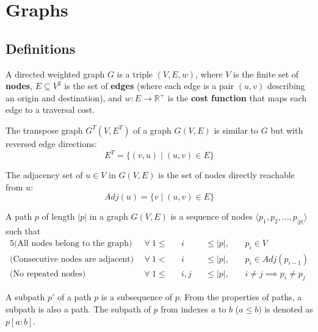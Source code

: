 \section{Graphs} \label{graphs}
\subsection{Definitions}
\begin{definition}
    A directed weighted graph $G$ is a triple $(V, E, w)$, where
    $V$ is the finite set of \textbf{nodes}, $E \subseteq V^2$ is the set of \textbf{edges} (where each edge is a pair $(u,v)$ describing an origin and destination), and $w: E \rightarrow \mathbb{R}^+$ is the \textbf{cost function} that maps each edge to a traversal cost.
\end{definition}
\begin{definition}
    The transpose graph $G^T(V, E^T)$ of a graph $G(V, E)$ is similar to $G$ but with reversed edge directions:
    \begin{equation*}
        E^T = \{(v,u) \mid (u,v) \in E\}
    \end{equation*}
\end{definition}
\begin{definition}
    The adjacency set of $u \in V$ in $G(V,E)$ is the set of nodes directly reachable from $u$:
    \begin{equation*}
        Adj(u) = \{v \mid (u, v) \in E\}
    \end{equation*}
\end{definition}
\begin{definition}[Path]
    A path $p$ of length $|p|$ in a graph $G(V,E)$ is a sequence of nodes $\langle p_1,p_2,...,p_{|p|}\rangle$ such that
    \begin{alignat*}{5}
        \text{(All nodes belong to the graph)}       ~~&\forall~1 \leq &&i   &&\leq |p|,&&~p_i \in V \\
        \text{(Consecutive nodes are adjacent)}      ~~&\forall~1 <    &&i   &&\leq |p|,&&~p_i \in Adj(p_{i-1})\\
        \text{(No repeated nodes)}                   ~~&\forall~1 \leq &&i,j &&\leq |p|,&&~i\neq j \implies p_i \neq p_j
    \end{alignat*}
\end{definition}
\begin{definition}[Subpath]
    A subpath $p'$ of a path $p$ is a subsequence of $p$. From the properties of paths, a subpath is also a path. The subpath of $p$ from indexes $a$ to $b$ ($a \leq b)$ is denoted as $p[a:b]$.
\end{definition}
